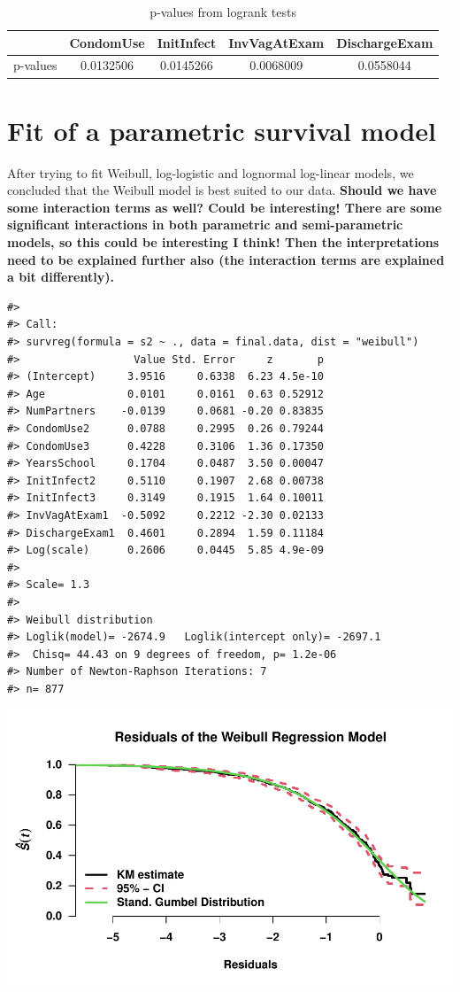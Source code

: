 \documentclass[
]{article}
\begin{document}
\begin{table}

\caption{\label{tab:pvalues}p-values from logrank tests}
\centering
\begin{tabular}[t]{l|c|c|c|c}
\hline
  & CondomUse & InitInfect & InvVagAtExam & DischargeExam\\
\hline
p-values & 0.0132506 & 0.0145266 & 0.0068009 & 0.0558044\\
\hline
\end{tabular}
\end{table}

\hypertarget{fit-of-a-parametric-survival-model}{%
\section{Fit of a parametric survival model}\label{fit-of-a-parametric-survival-model}}

After trying to fit Weibull, log-logistic and lognormal log-linear models, we concluded that the Weibull model is best suited to our data.
\textbf{Should we have some interaction terms as well? Could be interesting! There are some significant interactions in both parametric and semi-parametric models, so this could be interesting I think! Then the interpretations need to be explained further also (the interaction terms are explained a bit differently).}

\begin{verbatim}
#> 
#> Call:
#> survreg(formula = s2 ~ ., data = final.data, dist = "weibull")
#>                  Value Std. Error     z       p
#> (Intercept)     3.9516     0.6338  6.23 4.5e-10
#> Age             0.0101     0.0161  0.63 0.52912
#> NumPartners    -0.0139     0.0681 -0.20 0.83835
#> CondomUse2      0.0788     0.2995  0.26 0.79244
#> CondomUse3      0.4228     0.3106  1.36 0.17350
#> YearsSchool     0.1704     0.0487  3.50 0.00047
#> InitInfect2     0.5110     0.1907  2.68 0.00738
#> InitInfect3     0.3149     0.1915  1.64 0.10011
#> InvVagAtExam1  -0.5092     0.2212 -2.30 0.02133
#> DischargeExam1  0.4601     0.2894  1.59 0.11184
#> Log(scale)      0.2606     0.0445  5.85 4.9e-09
#> 
#> Scale= 1.3 
#> 
#> Weibull distribution
#> Loglik(model)= -2674.9   Loglik(intercept only)= -2697.1
#>  Chisq= 44.43 on 9 degrees of freedom, p= 1.2e-06 
#> Number of Newton-Raphson Iterations: 7 
#> n= 877
\end{verbatim}

\includegraphics{practical_files/figure-latex/weibull-resids-1.pdf}
\end{document}
